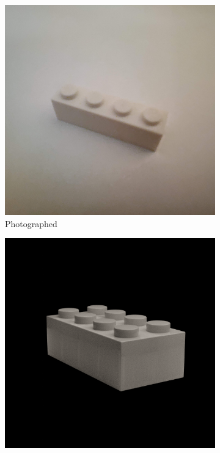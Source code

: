 \documentclass[]{article}
\begin{document}
\begin{enumerate}
\begin{itemize}
\begin{figure}[h]
\begin{subfigure}[b]{0.25\textwidth}
                \includegraphics[width=\textwidth]{photographed images/7.jpg}
                \caption{Photographed}
            \end{subfigure}
            \begin{subfigure}[b]{0.25\textwidth}
                \centering
                \includegraphics[width=\textwidth]{generated images/50.png}

\end{subfigure}
\end{figure}
\end{itemize}
\end{enumerate}
\end{document}

